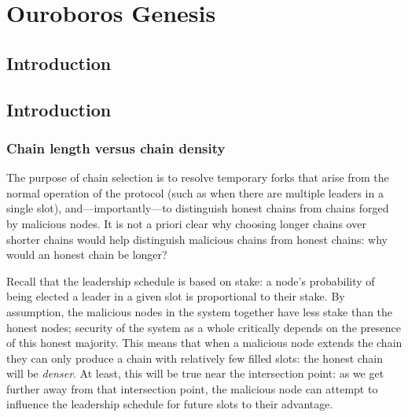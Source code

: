 \newcommand{\RequiredPeers}{\ensuremath{N_\mathit{rs}}}

\newcommand{\VerifiedByResearchers}{\todo{Verify}}

\chapter{Ouroboros Genesis}
\label{genesis}

\section{Introduction}





\pagebreak


\section{Introduction}

\subsection{Chain length versus chain density}
\label{genesis:intro:length-vs-density}

The purpose of chain selection is to resolve temporary forks that arise from the
normal operation of the protocol (such as when there are multiple leaders in a
single slot), and---importantly---to distinguish honest chains from chains
forged by malicious nodes. It is not a priori clear why choosing longer chains
over shorter chains would help distinguish malicious chains from honest chains:
why would an honest chain be longer?

Recall that the leadership schedule is based on stake: a node's probability of
being elected a leader in a given slot is proportional to their stake. By
assumption, the malicious nodes in the system together have less stake than the
honest nodes; security of the system as a whole critically depends on the
presence of this honest majority. This means that when a malicious node extends
the chain they can only produce a chain with relatively few filled slots: the
honest chain will be \emph{denser}. At least, this will be true near the
intersection point: as we get further away from that intersection point, the
malicious node can attempt to influence the leadership schedule for future slots
to their advantage.

